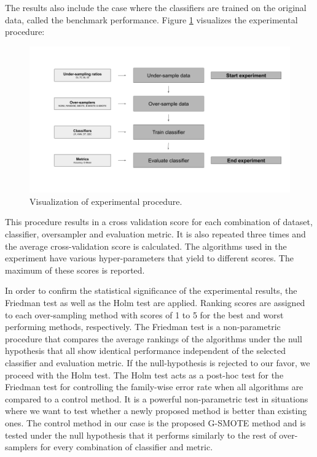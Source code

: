 \documentclass[parskip=full]{scrartcl}
\begin{document}
The results also include the case where the classifiers are trained on the
original data, called the benchmark performance. Figure
\ref{fig:experimentalprocedure} visualizes the experimental procedure: 

\begin{figure}[H]
	\centering
	\includegraphics[width=1.0\linewidth]{../analysis/experimental_procedure.png}
	\caption{Visualization of experimental procedure.}
	\label{fig:experimentalprocedure}
\end{figure}

This procedure results in a cross validation score for each combination of
dataset, classifier, oversampler and evaluation metric. It is also repeated
three times and the average cross-validation score is calculated. The algorithms
used in the experiment have various hyper-parameters that yield to different
scores. The maximum of these scores is reported.

In order to confirm the statistical significance of the experimental results,
the Friedman test \cite{Sheldon.1996} as well as the Holm test
\cite{JanezDemsar.2006} are applied. Ranking scores are assigned to each
over-sampling method with scores of 1 to 5 for the best and worst performing
methods, respectively. The Friedman test is a non-parametric procedure that
compares the average rankings of the algorithms under the null hypothesis that
all show identical performance independent of the selected classifier and
evaluation metric. If the null-hypothesis is rejected to our favor, we proceed
with the Holm test. The Holm test acts as a post-hoc test for the Friedman test
for controlling the family-wise error rate when all algorithms are compared to a
control method. It is a powerful non-parametric test in situations where we want
to test whether a newly proposed method is better than existing ones. The
control method in our case is the proposed G-SMOTE method and is tested under
the null hypothesis that it performs similarly to the rest of over-samplers for
every combination of classifier and metric.
\end{document}
